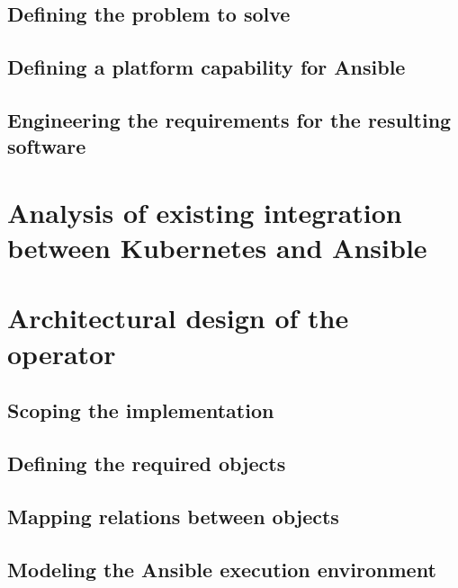 \documentclass[
	12pt, %
	a4paper,
	liststotoc, %
	bibtotoc, %
	pointlessnumbers, %
	headsepline, %
	footsepline, %
	oneside %
	]{scrbook} %
\begin{document}
\section{Defining the problem to solve}


\section{Defining a platform capability for Ansible}


\section{Engineering the requirements for the resulting software}
\label{ch:requirements}


\chapter{Analysis of existing integration between Kubernetes and Ansible}
\label{ch:analysis}


\chapter{Architectural design of the operator}
\label{ch:architecture}


\section{Scoping the implementation}


\section{Defining the required objects}


\section{Mapping relations between objects}


\section{Modeling the Ansible execution environment}

\end{document}

